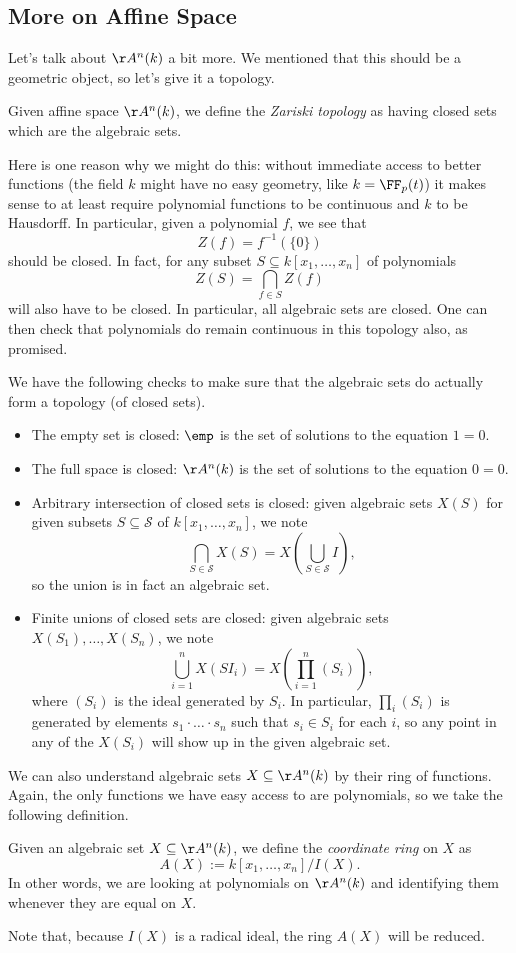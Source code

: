 \subsection{More on Affine Space}
Let's talk about $\AA^n(k)$ a bit more. We mentioned that this should be a geometric object, so let's give it a topology.
\begin{definition}
	Given affine space $\AA^n(k)$, we define the \textit{Zariski topology} as having closed sets which are the algebraic sets.
\end{definition}
\begin{remark}[Nir]
	Here is one reason why we might do this: without immediate access to better functions (the field $k$ might have no easy geometry, like $k=\FF_p(t)$) it makes sense to at least require polynomial functions to be continuous and $k$ to be Hausdorff. In particular, given a polynomial $f$, we see that
	\[Z(f)=f^{-1}(\{0\})\]
	should be closed. In fact, for any subset $S\subseteq k[x_1,\ldots,x_n]$ of polynomials
	\[Z(S)=\bigcap_{f\in S}Z(f)\]
	will also have to be closed. In particular, all algebraic sets are closed. One can then check that polynomials do remain continuous in this topology also, as promised.
\end{remark}
We have the following checks to make sure that the algebraic sets do actually form a topology (of closed sets).
\begin{itemize}
	\item The empty set is closed: $\emp$ is the set of solutions to the equation $1=0$.
	\item The full space is closed: $\AA^n(k)$ is the set of solutions to the equation $0=0$.
	\item Arbitrary intersection of closed sets is closed: given algebraic sets $X(S)$ for given subsets $S\subseteq\mathcal S$ of $k[x_1,\ldots,x_n]$, we note
	\[\bigcap_{S\in\mathcal S}X(S)=X\left(\bigcup_{S\in\mathcal S}I\right),\]
	so the union is in fact an algebraic set.
	\item Finite unions of closed sets are closed: given algebraic sets $X(S_1),\ldots,X(S_n)$, we note
	\[\bigcup_{i=1}^nX(SI_i)=X\left(\prod_{i=1}^n(S_i)\right),\]
	where $(S_i)$ is the ideal generated by $S_i$. In particular, $\prod_i(S_i)$ is generated by elements $s_1\cdot\ldots\cdot s_n$ such that $s_i\in S_i$ for each $i$, so any point in any of the $X(S_i)$ will show up in the given algebraic set.
\end{itemize}
We can also understand algebraic sets $X\subseteq\AA^n(k)$ by their ring of functions. Again, the only functions we have easy access to are polynomials, so we take the following definition.
\begin{definition}
	Given an algebraic set $X\subseteq\AA^n(k)$, we define the \textit{coordinate ring} on $X$ as
	\[A(X):=k[x_1,\ldots,x_n]/I(X).\]
	In other words, we are looking at polynomials on $\AA^n(k)$ and identifying them whenever they are equal on $X$.
\end{definition}
Note that, because $I(X)$ is a radical ideal, the ring $A(X)$ will be reduced.

